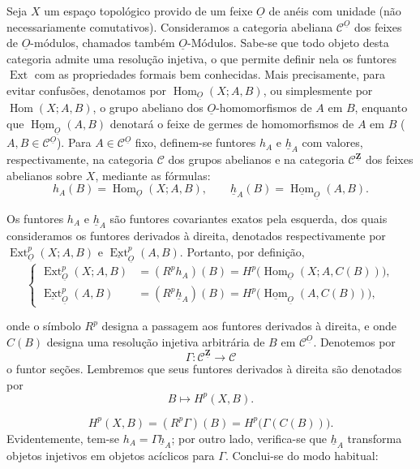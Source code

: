 \documentclass[11pt,twoside,openany]{book}
\numberwithin{equation}{section}
\newcommand{\src}[1]{%
  \phantomsection\hypertarget{src:#1}{}%
  \marginpar{\raggedleft\footnotesize\sffamily #1}%
}
\newcommand{\Osh}{\underline{O}}
\newcommand{\Zsh}{\underline{\mathbf Z}}
\newcommand{\Ccat}{\mathcal C}
\newcommand{\Homsh}{\underline{\operatorname{Hom}}}
\newcommand{\Extsh}{\underline{\operatorname{Ext}}}
\newcommand{\hsh}{\underline{h}}
\newcommand{\fquote}[1]{\textquotedbl#1\textquotedbl}
\theoremstyle{plain}
\theoremstyle{definition}
\theoremstyle{remark}
\newcommand{\FgaUnitKey}{frontmatter}
\renewcommand{\src}[1]{%
  \phantomsection\hypertarget{src:\FgaUnitKey:#1}{}%
  \marginpar{\raggedleft\footnotesize\sffamily #1}%
}
\begin{document}
Seja $X$ um espaço topológico provido de um feixe $\Osh$ de anéis com unidade
(não necessariamente comutativos). Consideramos a categoria abeliana
$\Ccat^{\Osh}$ dos feixes de $\Osh$-módulos, chamados também $\Osh$-Módulos.
Sabe-se que todo objeto desta categoria admite uma resolução injetiva, o que
permite definir nela os funtores $\operatorname{Ext}$ com as propriedades
formais bem conhecidas. Mais precisamente, para evitar confusões,
denotamos por $\operatorname{Hom}_{\Osh}(X;A,B)$, ou simplesmente por
$\operatorname{Hom}(X;A,B)$, o grupo abeliano dos $\Osh$-homomorfismos de $A$
em $B$, enquanto que $\Homsh_{\Osh}(A,B)$ denotará o feixe de germes
de homomorfismos de $A$ em $B$ ($A,B\in\Ccat^{\Osh}$). Para
$A\in\Ccat^{\Osh}$ fixo, definem-se funtores $h_A$ e $\hsh_A$ com valores, respectivamente,
na categoria $\Ccat$ dos grupos abelianos e na categoria
$\Ccat^{\Zsh}$ dos feixes abelianos sobre $X$, mediante as fórmulas:
\begin{equation}\tag{1.1}
  h_A(B)=\operatorname{Hom}_{\Osh}(X;A,B),
  \qquad
  \hsh_A(B)=\Homsh_{\Osh}(A,B).
\end{equation}

Os funtores $h_A$ e $\hsh_A$ são funtores covariantes exatos pela esquerda,
dos quais consideramos os funtores derivados à direita, denotados respectivamente por
$\operatorname{Ext}_{\Osh}^{p}(X;A,B)$ e $\Extsh_{\Osh}^{p}(A,B)$. Portanto,
por definição,
\begin{equation}\tag{1.2}
\left\{
\begin{aligned}
\operatorname{Ext}_{\Osh}^{p}(X;A,B)
  &= (R^{p}h_A)(B)
   = H^{p}\bigl(\operatorname{Hom}_{\Osh}(X;A,C(B))\bigr),\\
\Extsh_{\Osh}^{p}(A,B)
  &= (R^{p}\hsh_A)(B)
   = H^{p}\bigl(\Homsh_{\Osh}(A,C(B))\bigr),
\end{aligned}
\right.
\end{equation}

onde o símbolo $R^{p}$ designa a passagem aos funtores derivados à direita, e onde
$C(B)$ designa uma resolução injetiva arbitrária de $B$ em $\Ccat^{\Osh}$.
Denotemos por
\[
  \Gamma:\Ccat^{\Zsh}\longrightarrow\Ccat
\]
o funtor \fquote{seções}. Lembremos que seus funtores derivados à direita são
denotados por
\[
  B\longmapsto H^{p}(X,B).
\]

\src{170}
\begin{equation}\tag{1.3}
  H^{p}(X,B)=(R^{p}\Gamma)(B)=H^{p}\bigl(\Gamma(C(B))\bigr).
\end{equation}
Evidentemente, tem-se $h_A=\Gamma\hsh_A$; por outro lado, verifica-se que $\hsh_A$
transforma objetos injetivos em objetos acíclicos para $\Gamma$. Conclui-se do
modo habitual:
\end{document}
